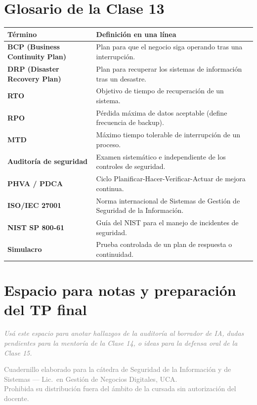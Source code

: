 \documentclass[12pt,a4paper]{article}
\renewcommand{\arraystretch}{1.25}
\begin{document}
\newpage
\section{Glosario de la Clase 13}

\renewcommand{\arraystretch}{1.4}
\begin{tabularx}{\textwidth}{>{\bfseries}p{4.5cm}X}
\toprule
\textbf{T\'ermino} & \textbf{Definici\'on en una l\'inea} \\
\midrule
BCP (Business Continuity Plan) & Plan para que el negocio siga operando tras una interrupci\'on. \\
DRP (Disaster Recovery Plan) & Plan para recuperar los sistemas de informaci\'on tras un desastre. \\
RTO & Objetivo de tiempo de recuperaci\'on de un sistema. \\
RPO & P\'erdida m\'axima de datos aceptable (define frecuencia de backup). \\
MTD & M\'aximo tiempo tolerable de interrupci\'on de un proceso. \\
Auditor\'ia de seguridad & Examen sistem\'atico e independiente de los controles de seguridad. \\
PHVA / PDCA & Ciclo Planificar-Hacer-Verificar-Actuar de mejora continua. \\
ISO/IEC 27001 & Norma internacional de Sistemas de Gesti\'on de Seguridad de la Informaci\'on. \\
NIST SP 800-61 & Gu\'ia del NIST para el manejo de incidentes de seguridad. \\
Simulacro & Prueba controlada de un plan de respuesta o continuidad. \\
\bottomrule
\end{tabularx}

\vspace{1cm}

\section{Espacio para notas y preparaci\'on del TP final}

\begin{tcolorbox}[colback=grisClaro, colframe=gray!50, arc=2mm, height=7cm]
\textcolor{gray}{\itshape Us\'a este espacio para anotar hallazgos de la auditor\'ia al borrador de IA, dudas pendientes para la mentor\'ia de la Clase 14, o ideas para la defensa oral de la Clase 15.}
\end{tcolorbox}

\vfill
\begin{center}
\small\textcolor{gray}{%
Cuadernillo elaborado para la c\'atedra de Seguridad de la Informaci\'on y de
Sistemas --- Lic.\ en Gesti\'on de Negocios Digitales, UCA.\\
Prohibida su distribuci\'on fuera del \'ambito de la cursada sin autorizaci\'on del docente.}
\end{center}
\end{document}
